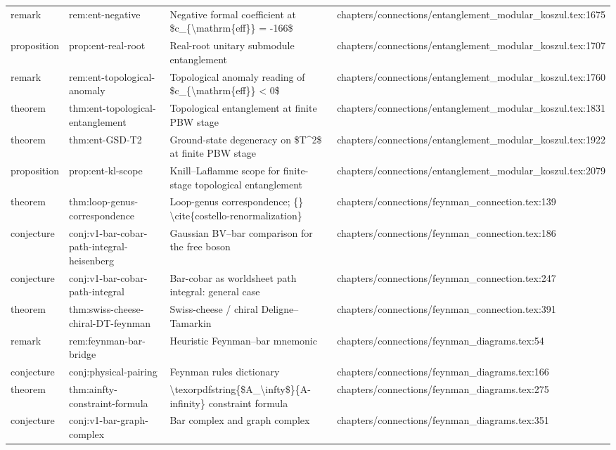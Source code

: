\documentclass[11pt]{article}
\begin{document}
\begin{longtable}{L{0.10\textwidth}L{0.26\textwidth}L{0.42\textwidth}L{0.22\textwidth}}
remark & rem:ent-negative & Negative formal coefficient at \$c\_\{\textbackslash{}mathrm\{eff\}\} = -166\$ & chapters/connections/entanglement\_modular\_koszul.tex:1675\\
proposition & prop:ent-real-root & Real-root unitary submodule entanglement & chapters/connections/entanglement\_modular\_koszul.tex:1707\\
remark & rem:ent-topological-anomaly & Topological anomaly reading of \$c\_\{\textbackslash{}mathrm\{eff\}\} < 0\$ & chapters/connections/entanglement\_modular\_koszul.tex:1760\\
theorem & thm:ent-topological-entanglement & Topological entanglement at finite PBW stage & chapters/connections/entanglement\_modular\_koszul.tex:1831\\
theorem & thm:ent-GSD-T2 & Ground-state degeneracy on \$T\textasciicircum{}2\$ at finite PBW stage & chapters/connections/entanglement\_modular\_koszul.tex:1922\\
proposition & prop:ent-kl-scope & Knill--Laflamme scope for finite-stage topological entanglement & chapters/connections/entanglement\_modular\_koszul.tex:2079\\
theorem & thm:loop-genus-correspondence & Loop-genus correspondence; \{\} \textbackslash{}cite\{costello-renormalization\} & chapters/connections/feynman\_connection.tex:139\\
conjecture & conj:v1-bar-cobar-path-integral-heisenberg & Gaussian BV--bar comparison for the free boson & chapters/connections/feynman\_connection.tex:186\\
conjecture & conj:v1-bar-cobar-path-integral & Bar-cobar as worldsheet path integral: general case & chapters/connections/feynman\_connection.tex:247\\
theorem & thm:swiss-cheese-chiral-DT-feynman & Swiss-cheese / chiral Deligne--Tamarkin & chapters/connections/feynman\_connection.tex:391\\
remark & rem:feynman-bar-bridge & Heur{}istic Feynman--bar mnemonic & chapters/connections/feynman\_diagrams.tex:54\\
conjecture & conj:physical-pairing & Feynman rules dictionary & chapters/connections/feynman\_diagrams.tex:166\\
theorem & thm:ainfty-constraint-formula & \textbackslash{}texorpdfstring\{\$A\_\textbackslash{}infty\$\}\{A-infinity\} constraint formula & chapters/connections/feynman\_diagrams.tex:275\\
conjecture & conj:v1-bar-graph-complex & Bar complex and graph complex & chapters/connections/feynman\_diagrams.tex:351\\

\end{longtable}
\end{document}
